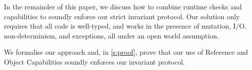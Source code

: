 

In the remainder of this paper, we discuss how to combine runtime checks and capabilities
to soundly enforce our strict invariant protocol.
Our solution only requires 
that all code is well-typed, and works in the presence of mutation, I/O, non-determinism, and exceptions, all under an open world assumption.

We formalise our approach and, in \ref{s:proof}, prove that our use of Reference and Object Capabilities soundly enforces our invariant protocol.

